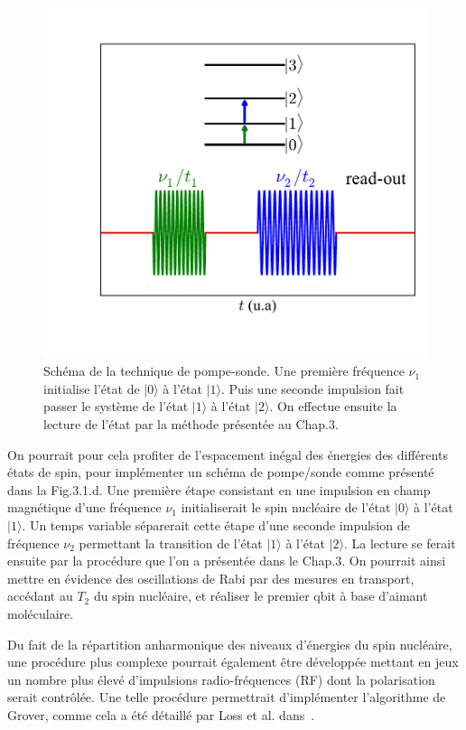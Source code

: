 \begin{figure}[h!]
\parbox{7cm}{
\includegraphics[scale=0.45]{Conclusion/spin_nuc_man/spin_nuc_man.pdf} 
}
\parbox{6.5cm}{\caption{Schéma de la technique de pompe-sonde. Une première fréquence $\nu_1$ initialise l'état de $|0\rangle$ à l'état $|1\rangle$. Puis une seconde impulsion fait passer le système de l'état $|1\rangle$ à l'état $|2\rangle$. On effectue ensuite la lecture de l'état par la méthode présentée au Chap.3.}
\label{spin_nuc_man}
}
\end{figure}

On pourrait pour cela profiter de l'espacement inégal des énergies des différents états de spin, pour implémenter un schéma de pompe/sonde comme présenté dans la Fig.3.1.d. Une première étape consistant en une impulsion en champ magnétique d'une fréquence $\nu_1$ initialiserait le spin nucléaire de l’état $|0\rangle$ à l'état $|1\rangle$. Un temps variable séparerait cette étape d'une seconde impulsion de fréquence $\nu_2$ permettant la transition de l’état $|1\rangle$ à l’état $|2\rangle$. La lecture se ferait ensuite par la procédure que l'on a présentée dans le Chap.3. On pourrait ainsi mettre en évidence des oscillations de Rabi par des mesures en transport, accédant au $T_2$ du spin nucléaire, et réaliser le premier qbit à base d'aimant moléculaire.

Du fait de la répartition anharmonique des niveaux d’énergies du spin nucléaire, une procédure plus complexe pourrait également être développée mettant en jeux un nombre plus élevé d'impulsions radio-fréquences (RF) dont la polarisation serait contrôlée. Une telle procédure permettrait d’implémenter l'algorithme de Grover, comme cela a été détaillé par Loss et al. dans~\cite{Leuenberger2003}.

